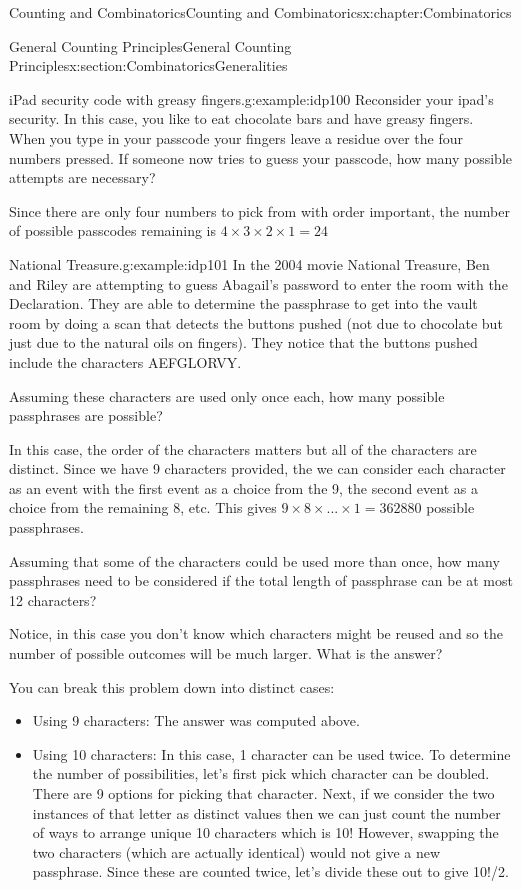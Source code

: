 \documentclass[oneside,10pt,]{book}
\numberwithin{equation}{section}
\begin{document}
\begin{chapterptx}{Counting and Combinatorics}{}{Counting and Combinatorics}{}{}{x:chapter:Combinatorics}
\begin{sectionptx}{General Counting Principles}{}{General Counting Principles}{}{}{x:section:CombinatoricsGeneralities}
\begin{example}{iPad security code with greasy fingers.}{g:example:idp100}
Reconsider your ipad's security. In this case, you like to eat chocolate bars and have greasy fingers. When you type in your passcode your fingers leave a residue over the four numbers pressed. If someone now tries to guess your passcode, how many possible attempts are necessary?%
\par
Since there are only four numbers to pick from with order important, the number of possible passcodes remaining is \(4 \times 3 \times 2 \times 1 = 24\)%
\end{example}
\begin{example}{National Treasure.}{g:example:idp101}%
In the 2004 movie National Treasure, Ben and Riley are attempting to guess Abagail's password to enter the room with the Declaration. They are able to determine the passphrase to get into the vault room by doing a scan that detects the buttons pushed (not due to chocolate but just due to the natural oils on fingers). They notice that the buttons pushed include the characters AEFGLORVY.%
\par
Assuming these characters are used only once each, how many possible passphrases are possible?%
\par
In this case, the order of the characters matters but all of the characters are distinct. Since we have 9 characters provided, the we can consider each character as an event with the first event as a choice from the 9, the second event as a choice from the remaining 8, etc. This gives \(9 \times 8 \times ... \times 1 = 362880\) possible passphrases.%
\par
Assuming that some of the characters could be used more than once, how many passphrases need to be considered if the total length of passphrase can be at most 12 characters?%
\par
Notice, in this case you don't know which characters might be reused and so the number of possible outcomes will be much larger. What is the answer?%
\par
You can break this problem down into distinct cases:%
\begin{itemize}[label=\textbullet]
\item{}Using 9 characters: The answer was computed above.%
\item{}Using 10 characters: In this case, 1 character can be used twice. To determine the number of possibilities, let's first pick which character can be doubled. There are 9 options for picking that character.  Next, if we consider the two instances of that letter as distinct values then we can just count the number of ways to arrange unique 10 characters which is 10! However, swapping the two characters (which are actually identical) would not give a new passphrase. Since these are counted twice, let's divide these out to give 10!\slash{}2.%

\end{itemize}
\end{example}
\end{sectionptx}
\end{chapterptx}
\end{document}
